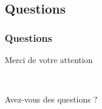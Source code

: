 \subsection{Questions}

\begin{frame}
	\frametitle{Questions}
	
	\begin{center}\begin{Huge}
		Merci de votre attention
		
		~
		
		Avez-vous des questions ?
	\end{Huge}\end{center}
\end{frame}
